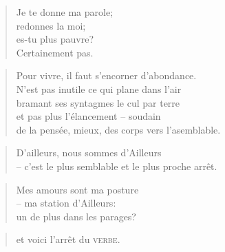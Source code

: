   \begin{verse}
    Je te donne ma parole;\\
    redonnes la moi;\\
    es-tu plus pauvre?\\
    Certainement pas.
  \end{verse}
  \begin{verse}
    Pour vivre, il faut s’encorner d’abondance.\\
    N’est pas inutile ce qui plane dans l’air\\
    bramant ses syntagmes le cul par terre\\
    et pas plus l’élancement -- {\Large soudain}\\
    de la pensée, mieux, des corps vers l’asemblable.
  \end{verse}
  \begin{verse}
    D’ailleurs, nous sommes d’Ailleurs\\
    -- c’est le plus semblable et le plus proche arrêt.
  \end{verse}
  \begin{verse}
    Mes amours sont ma posture\\
    -- ma station d’Ailleurs:\\
    un de plus dans les parages?
  \end{verse}
  \begin{verse}
    et voici l’arrêt du \textsc{verbe}.
  \end{verse}
